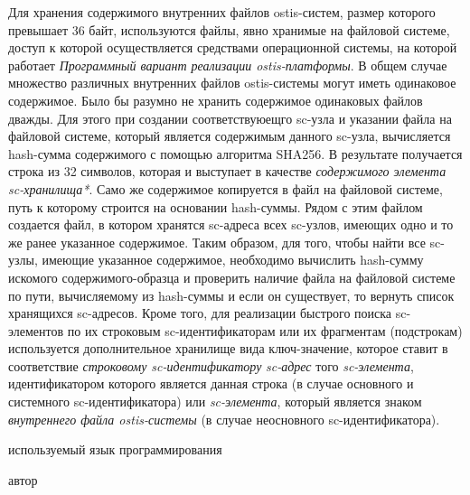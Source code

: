 Для хранения содержимого внутренних файлов ostis-систем, размер которого превышает 36 байт, используются файлы, явно
хранимые на файловой системе, доступ к которой осуществляется средствами операционной системы, на которой работает
\textit{Программный вариант реализации ostis-платформы}. В общем случае множество различных внутренних файлов ostis-системы
могут иметь одинаковое содержимое. Было бы разумно не хранить содержимое одинаковых файлов дважды. Для этого при создании
соответствуюещго sc-узла и указании файла на файловой системе, который является содержимым данного sc-узла, вычисляется
hash-сумма содержимого с помощью алгоритма SHA256. В результате получается строка из 32 символов, которая и выступает в
качестве \textit{содержимого элемента sc-хранилища*}. Само же содержимое копируется в файл на файловой системе, путь к
которому строится на основании hash-суммы. Рядом с этим файлом создается файл, в котором хранятся sc-адреса всех sc-узлов,
имеющих одно и то же ранее указанное содержимое. Таким образом, для того, чтобы найти все sc-узлы, имеющие указанное
содержимое, необходимо вычислить hash-сумму искомого содержимого-образца и проверить наличие файла на файловой системе
по пути, вычисляемому из hash-суммы и если он существует, то вернуть список хранящихся sc-адресов. Кроме того, для реализации
быстрого поиска sc-элементов по их строковым sc-идентификаторам или их фрагментам (подстрокам) используется дополнительное
хранилище вида ключ-значение, которое ставит в соответствие \textit{строковому sc-идентификатору} \textit{sc-адрес}
того \textit{sc-элемента}, идентификатором которого является данная строка (в случае основного и системного sc-идентификатора)
или \textit{sc-элемента}, который является знаком \textit{внутреннего файла ostis-системы} (в случае неосновного
sc-идентификатора).

\begin{SCn}
\begin{scnrelfromlist}{используемый язык программирования}
\end{scnrelfromlist}
\begin{scnrelfromlist}{автор}
\end{scnrelfromlist}
\end{SCn}

